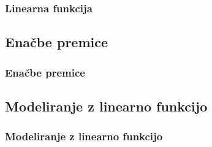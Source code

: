         \begin{frame}
            \frametitle{Linearna funkcija}
        \end{frame}

    \subsection{Enačbe premice}

        \begin{frame}
            \frametitle{Enačbe premice}
        \end{frame}

    \subsection{Modeliranje z linearno funkcijo}

        \begin{frame}
            \frametitle{Modeliranje z linearno funkcijo}
        \end{frame}
